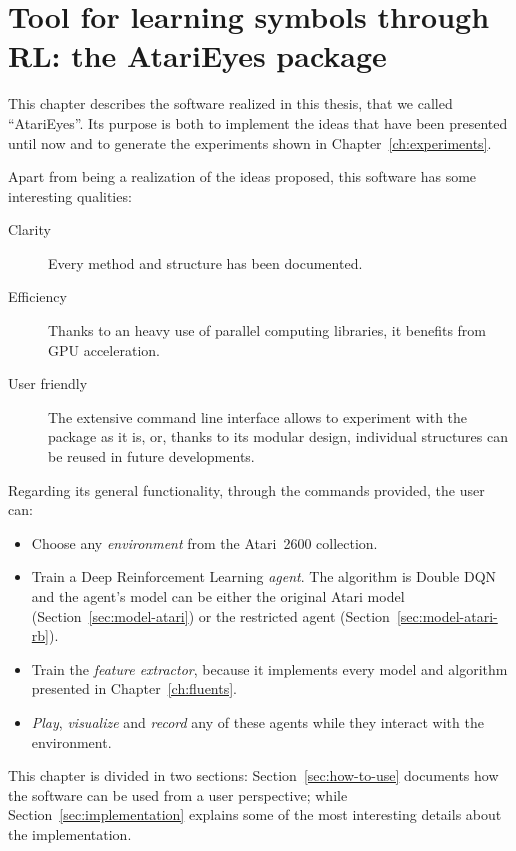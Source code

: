 \chapter{Tool for learning symbols through RL: the AtariEyes package}

\label{ch:atarieyes}

This chapter describes the software realized in this thesis, that we called
``AtariEyes''. Its purpose is both to implement the ideas that have been
presented until now and to generate the experiments shown in
Chapter~\ref{ch:experiments}.

Apart from being a realization of the ideas proposed, this software has some
interesting qualities:
\begin{description}
	\item [Clarity] Every method and structure has been documented.
	\item [Efficiency] Thanks to an heavy use of parallel computing libraries,
		it benefits from GPU acceleration.
	\item [User friendly] The extensive command line interface allows to
		experiment with the package as it is, or, thanks to its modular design,
		individual structures can be reused in future developments.
\end{description}

Regarding its general functionality, through the commands provided, the user
can:
\begin{itemize}
	\item Choose any \emph{environment} from the Atari~2600 collection.
	\item Train a Deep Reinforcement Learning \emph{agent}. The algorithm is
		Double DQN and the agent's model can be either the original Atari model
		(Section~\ref{sec:model-atari}) or the restricted agent
		(Section~\ref{sec:model-atari-rb}).
	\item Train the \emph{feature extractor}, because it implements every model
		and algorithm presented in Chapter~\ref{ch:fluents}.
	\item \emph{Play}, \emph{visualize} and \emph{record} any of these
		agents while they interact with the environment.
\end{itemize}

This chapter is divided in two sections: Section~\ref{sec:how-to-use}
documents how the software can be used from a user perspective;
while Section~\ref{sec:implementation} explains some of the most interesting
details about the implementation.


